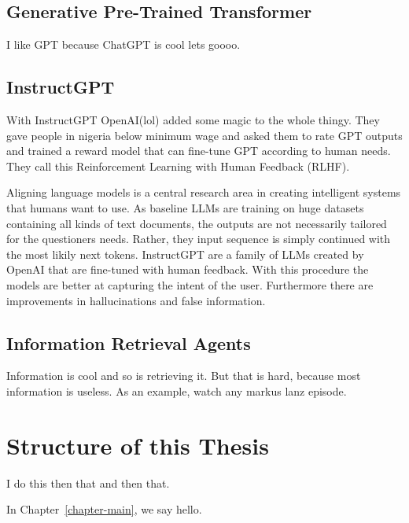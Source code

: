 \documentclass[english, version-2022-01]{uzl-thesis}
\begin{document}
\subsection{Generative Pre-Trained Transformer}
I like GPT because ChatGPT is cool lets goooo.

\subsection{InstructGPT}
With InstructGPT OpenAI(lol) added some magic to the whole thingy. They gave people in nigeria below minimum wage and asked them to rate GPT outputs and trained a reward model that can fine-tune GPT according to human needs. They call this Reinforcement Learning with Human Feedback (RLHF).

Aligning language models is a central research area in creating intelligent systems that humans want to use. As baseline LLMs are training on huge datasets containing all kinds of text documents, the outputs are not necessarily tailored for the questioners needs.
Rather, they input sequence is simply continued with the most likily next tokens. InstructGPT are a family of LLMs created by OpenAI that are fine-tuned with human feedback. With this procedure the models are better at capturing the intent of the user. Furthermore there are improvements in hallucinations and false information.
\subsection{Information Retrieval Agents}
Information is cool and so is retrieving it. But that is hard, because most information is useless. As an example, watch any markus lanz episode.
\section{Structure of this Thesis}
I do this then that and then that.

In Chapter~\vref{chapter-main}, we say hello.
\end{document}
